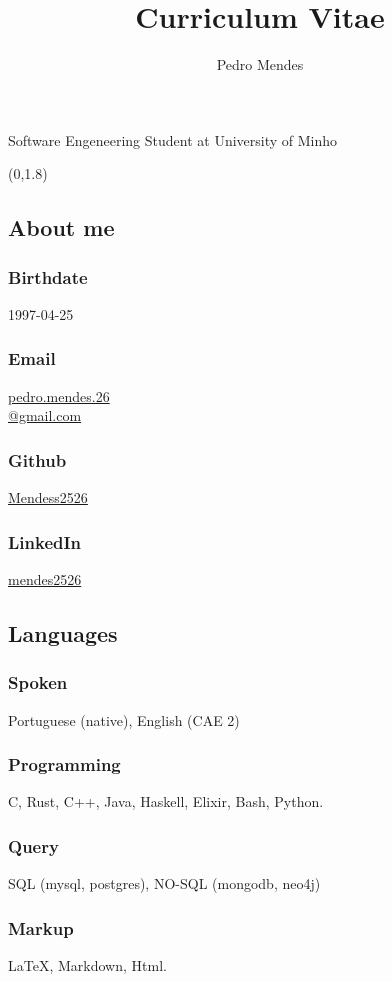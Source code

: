 \documentclass{article}
\renewcommand{\maketitle}{
    \begin{center}
        {\huge\bfseries\theauthor}

        \vspace{.25em}

        \Large{Software Engeneering Student at University of Minho}

        \vspace{.25em}

        \large{\thetitle}
    \end{center}
}
\begin{document}
\title{Curriculum Vitae}
\author{Pedro Mendes}

\maketitle

\begin{textblock}{2}(0,1.8)
    \begin{flushright}
        \subsection{\hfill About me}
        \subsubsection{\hfill Birthdate}
        1997-04-25
        \subsubsection{\hfill Email}
        \href{mailto:pedro.mendes.26@gmail.com}{pedro.mendes.26\\@gmail.com}
        \subsubsection{\hfill Github}
        \href{https://github.com/Mendess2526}{Mendess2526}
        \subsubsection{\hfill LinkedIn}
        \href{https://www.linkedin.com/in/mendes2526/}{mendes2526}

        \subsection{\hfill Languages}
        \subsubsection{\hfill Spoken}
        Portuguese (native), English (CAE 2)
        \subsubsection{\hfill Programming}
        C, Rust, C++, Java, Haskell, Elixir, Bash, Python.
        \subsubsection{\hfill Query}
        SQL (mysql, postgres), NO-SQL (mongodb, neo4j)
        \subsubsection{\hfill Markup}
        \LaTeX, Markdown, Html.
    \end{flushright}
\end{textblock}
\end{document}
